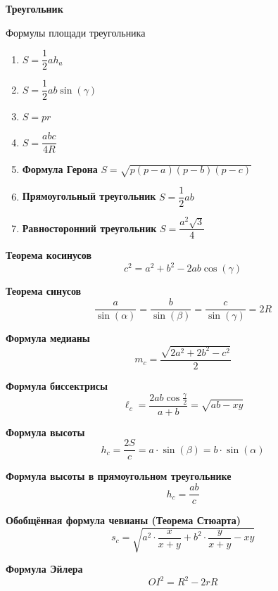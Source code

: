\documentclass{article}
\begin{document}
    \large

    \begin{center}
        \textbf{Треугольник}
    \end{center}

    \begin{enumerate_boxed}

        \item Формулы площади треугольника
        \begin{enumerate}
            \item $S = \dfrac{1}{2}ah_a$
            \item $S = \dfrac{1}{2}ab \sin(\gamma)$
            \item $S = pr$
            \item $S = \dfrac{abc}{4R}$
            \item \textbf{Формула Герона} $S = \sqrt{p(p-a)(p-b)(p-c)}$
            \item \textbf{Прямоугольный треугольник} $S = \dfrac{1}{2}ab$
            \item \textbf{Равносторонний треугольник} $S = \dfrac{a^2\sqrt{3}}{4}$
        \end{enumerate}

        \item \textbf{Теорема косинусов}
        \[c^2 = a^2 + b^2 - 2ab\cos(\gamma)\]

        \item \textbf{Теорема синусов}
        \[\frac{a}{\sin(\alpha)} = \frac{b}{\sin(\beta)} = \frac{c}{\sin(\gamma)} = 2R\]

        \item \textbf{Формула медианы}
        \[m_c = \frac{\sqrt{2a^2 + 2b^2 - c^2}}{2}\]

        \item \textbf{Формула биссектрисы}
        \[\ell_c = \frac{2ab\cos{\frac{\gamma}{2}}}{a + b} = \sqrt{ab - xy}\]

        \item \textbf{Формула высоты}
        \[h_c = \frac{2S}{c} = a\cdot\sin(\beta) = b\cdot\sin(\alpha)\]

        \textbf{Формула высоты в прямоугольном треугольнике}
        \[h_c = \frac{ab}{c}\]

        \item \textbf{Обобщённая формула чевианы (Теорема Стюарта)}
        \[s_c = \sqrt{a^2 \cdot \frac{x}{x + y} + b^2 \cdot \frac{y}{x + y} - xy}\]

        \item \textbf{Формула Эйлера}
        \[OI^2 = R^2 - 2rR\]


    \end{enumerate_boxed}
\end{document}
